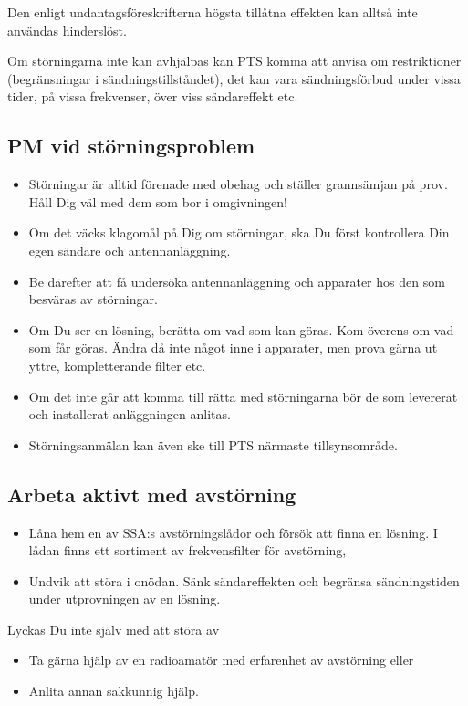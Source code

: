 Den enligt undantagsföreskrifterna högsta tillåtna effekten kan alltså inte användas hinderslöst.

Om störningarna inte kan avhjälpas kan PTS komma att anvisa om restriktioner
(begränsningar i sändningstillståndet), det kan vara sändningsförbud under
vissa tider, på vissa frekvenser, över viss sändareffekt etc.

\subsection{PM vid störningsproblem}
\begin{itemize}
\item Störningar är alltid förenade med obehag och ställer grannsämjan
  på prov. Håll Dig väl med dem som bor i omgivningen!
\item Om det väcks klagomål på Dig om störningar, ska Du först
  kontrollera Din egen sändare och antennanläggning.
\item Be därefter att få undersöka antennanläggning och apparater hos
  den som besväras av störningar.
\item Om Du ser en lösning, berätta om vad som kan göras. Kom överens
  om vad som får göras. Ändra då inte något inne i apparater, men
  prova gärna ut yttre, kompletterande filter etc.
\item Om det inte går att komma till rätta med störningarna bör de som
  levererat och installerat anläggningen anlitas.
\item Störningsanmälan kan även ske till PTS närmaste tillsynsområde.
\end{itemize}

\subsection{Arbeta aktivt med avstörning}
\begin{itemize}
\item Låna hem en av SSA:s avstörningslådor och försök att finna en
  lösning. I lådan finns ett sortiment av frekvensfilter för
  avstörning,
\item Undvik att störa i onödan. Sänk sändareffekten och begränsa
  sändningstiden under utprovningen av en lösning.
\end{itemize}

Lyckas Du inte själv med att störa av
\begin{itemize}
\item Ta gärna hjälp av en radioamatör med erfarenhet av avstörning
  eller
\item Anlita annan sakkunnig hjälp.
\end{itemize}

